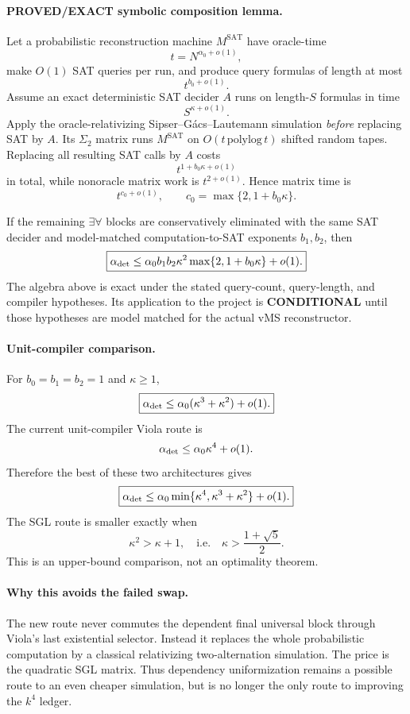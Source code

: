 \documentclass[11pt]{article}
\begin{document}
\paragraph{PROVED/EXACT symbolic composition lemma.}
Let a probabilistic reconstruction machine $M^{\mathrm{SAT}}$ have oracle-time
\[
t=N^{\alpha_0+o(1)},
\]
make $O(1)$ SAT queries per run, and produce query formulas of length at most
\[
t^{b_0+o(1)}.
\]
Assume an exact deterministic SAT decider $A$ runs on length-$S$ formulas in time
\[
S^{\kappa+o(1)}.
\]
Apply the oracle-relativizing Sipser--G\'acs--Lautemann simulation \emph{before} replacing SAT by $A$. Its $\Sigma_2$ matrix runs $M^{\mathrm{SAT}}$ on $O(t\,\mathrm{polylog}\,t)$ shifted random tapes. Replacing all resulting SAT calls by $A$ costs
\[
t^{1+b_0\kappa+o(1)}
\]
in total, while nonoracle matrix work is $t^{2+o(1)}$. Hence matrix time is
\[
\boxed{t^{c_0+o(1)},\qquad c_0=\max\{2,1+b_0\kappa\}.}
\]

If the remaining $\exists\forall$ blocks are conservatively eliminated with the same SAT decider and model-matched computation-to-SAT exponents $b_1,b_2$, then
\[
\boxed{
\alpha_{\rm det}
\le
\alpha_0 b_1b_2\kappa^2\max\{2,1+b_0\kappa\}
+o(1).
}
\]
The algebra above is exact under the stated query-count, query-length, and compiler hypotheses. Its application to the project is \textbf{CONDITIONAL} until those hypotheses are model matched for the actual vMS reconstructor.

\paragraph{Unit-compiler comparison.}
For $b_0=b_1=b_2=1$ and $\kappa\ge1$,
\[
\boxed{\alpha_{\rm det}\le\alpha_0(\kappa^3+\kappa^2)+o(1).}
\]
The current unit-compiler Viola route is
\[
\alpha_{\rm det}\le\alpha_0\kappa^4+o(1).
\]
Therefore the best of these two architectures gives
\[
\boxed{
\alpha_{\rm det}\le
\alpha_0\min\{\kappa^4,\kappa^3+\kappa^2\}+o(1).
}
\]
The SGL route is smaller exactly when
\[
\kappa^2>\kappa+1,
\quad\text{i.e.}\quad
\kappa>\frac{1+\sqrt5}{2}.
\]
This is an upper-bound comparison, not an optimality theorem.

\paragraph{Why this avoids the failed swap.}
The new route never commutes the dependent final universal block through Viola's last existential selector. Instead it replaces the whole probabilistic computation by a classical relativizing two-alternation simulation. The price is the quadratic SGL matrix. Thus dependency uniformization remains a possible route to an even cheaper simulation, but is no longer the only route to improving the $k^4$ ledger.
\end{document}
